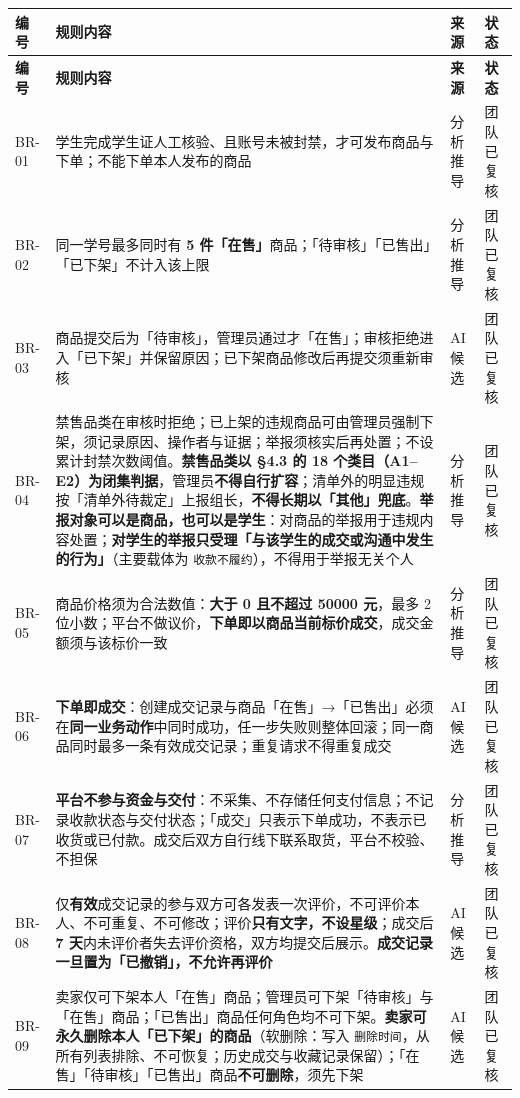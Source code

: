 \documentclass[12pt,a4paper]{ctexart}
\begin{document}
{\scriptsize
\begin{longtable}{|p{1.32cm}|p{12.03cm}|p{1.32cm}|p{1.32cm}|}
\hline
\textbf{编号} & \textbf{规则内容} & \textbf{来源} & \textbf{状态} \\
\hline
\endfirsthead
\hline
\textbf{编号} & \textbf{规则内容} & \textbf{来源} & \textbf{状态} \\
\hline
\endhead
\hline
\endfoot
BR-01 & 学生完成学生证人工核验、且账号未被封禁，才可发布商品与下单；不能下单本人发布的商品 & 分析推导 & 团队已复核 \\
\hline
BR-02 & 同一学号最多同时有 \textbf{5 件「在售」}商品；「待审核」「已售出」「已下架」不计入该上限 & 分析推导 & 团队已复核 \\
\hline
BR-03 & 商品提交后为「待审核」，管理员通过才「在售」；审核拒绝进入「已下架」并保留原因；已下架商品修改后再提交须重新审核 & AI 候选 & 团队已复核 \\
\hline
BR-04 & 禁售品类在审核时拒绝；已上架的违规商品可由管理员强制下架，须记录原因、操作者与证据；举报须核实后再处置；不设累计封禁次数阈值。\textbf{禁售品类以 §4.3 的 18 个类目（A1–E2）为闭集判据}，管理员\textbf{不得自行扩容}；清单外的明显违规按「清单外待裁定」上报组长，\textbf{不得长期以「其他」兜底}。\textbf{举报对象可以是商品，也可以是学生}：对商品的举报用于违规内容处置；\textbf{对学生的举报只受理「与该学生的成交或沟通中发生的行为」}（主要载体为 \texttt{收款不履约}），不得用于举报无关个人 & 分析推导 & 团队已复核 \\
\hline
BR-05 & 商品价格须为合法数值：\textbf{大于 0 且不超过 50000 元}，最多 2 位小数；平台不做议价，\textbf{下单即以商品当前标价成交}，成交金额须与该标价一致 & 分析推导 & 团队已复核 \\
\hline
BR-06 & \textbf{下单即成交}：创建成交记录与商品「在售」→「已售出」必须在\textbf{同一业务动作}中同时成功，任一步失败则整体回滚；同一商品同时最多一条有效成交记录；重复请求不得重复成交 & AI 候选 & 团队已复核 \\
\hline
BR-07 & \textbf{平台不参与资金与交付}：不采集、不存储任何支付信息；不记录收款状态与交付状态；「成交」只表示下单成功，不表示已收货或已付款。成交后双方自行线下联系取货，平台不校验、不担保 & 分析推导 & 团队已复核 \\
\hline
BR-08 & 仅\textbf{有效}成交记录的参与双方可各发表一次评价，不可评价本人、不可重复、不可修改；评价\textbf{只有文字，不设星级}；成交后 \textbf{7 天}内未评价者失去评价资格，双方均提交后展示。\textbf{成交记录一旦置为「已撤销」，不允许再评价} & AI 候选 & 团队已复核 \\
\hline
BR-09 & 卖家仅可下架本人「在售」商品；管理员可下架「待审核」与「在售」商品；「已售出」商品任何角色均不可下架。\textbf{卖家可永久删除本人「已下架」的商品}（软删除：写入 \texttt{删除时间}，从所有列表排除、不可恢复；历史成交与收藏记录保留）；「在售」「待审核」「已售出」商品\textbf{不可删除}，须先下架 & AI 候选 & 团队已复核 \\

\end{longtable}}
\end{document}
